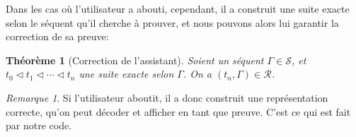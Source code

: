 \documentclass[11pt,a4paper]{article}
\theoremstyle{plain}
\newtheorem{theorem}{Théorème}
\theoremstyle{definition}
\theoremstyle{remark}
\newtheorem{remark}{Remarque}
\newcommand*{\sequent}{\Gamma}
\newcommand*{\sequents}{\ensuremath{\mathcal{S}}}
\newcommand*{\representations}{\ensuremath{\mathcal{R}}}
\newcommand*{\relapprox}{\ensuremath{\triangleleft}}
\begin{document}
Dans les cas où l'utilisateur a abouti, cependant, il a construit une suite exacte selon le séquent qu'il cherche à prouver, et nous pouvons alors lui garantir la correction de sa preuve: 

\begin{theorem}[Correction de l'assistant]
    Soient un séquent $\sequent \in \sequents$, et $t_0 \relapprox t_1 \relapprox \cdots \relapprox t_n$ une suite exacte selon $\sequent$.
    On a $(t_n, \sequent) \in \representations$.
\end{theorem}

\begin{remark}
    Si l'utilisateur aboutit, il a donc construit une représentation correcte, qu'on peut décoder et afficher en tant que preuve. C'est ce qui est fait par notre code.
\end{remark}
\end{document}
